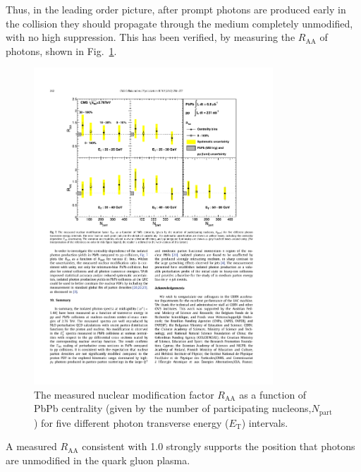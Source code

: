Thus, in the leading order picture, after prompt photons are produced early in the collision they should propagate through the medium completely unmodified, with no high \pt suppression. This has been verified, by measuring the $R_\mathrm{AA}$ of photons, shown in Fig.~\ref{fig:photon_raa}.

\begin{figure}[htpb]
  \centering
  \includegraphics[width=0.8\textwidth]{Introduction/photon_raa}
  \caption{The measured nuclear modification factor $R_\mathrm{AA}$ as a function of PbPb centrality (given by the number of participating nucleons,$N_\mathrm{part}$) for five different photon transverse energy ($E_\mathrm{T}$) intervals.}
  \label{fig:photon_raa}
\end{figure}

A measured $R_\mathrm{AA}$ consistent with 1.0 strongly supports the position that photons are unmodified in the quark gluon plasma.


